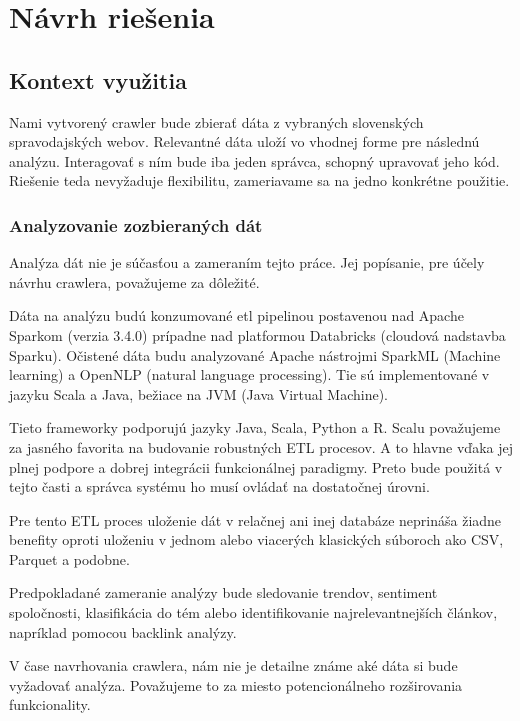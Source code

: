 
\chapter{Návrh riešenia}
\label{methodology}

\section{Kontext využitia}

Nami vytvorený crawler bude zbierať dáta z vybraných slovenských spravodajských webov. Relevantné dáta uloží vo vhodnej forme pre následnú analýzu. Interagovať s ním bude iba jeden správca, schopný upravovať jeho kód. Riešenie teda nevyžaduje flexibilitu, zameriavame sa na jedno konkrétne použitie. 

\subsection{Analyzovanie zozbieraných dát}
Analýza dát nie je súčasťou a zameraním tejto práce. Jej popísanie, pre účely návrhu crawlera, považujeme za dôležité.

Dáta na analýzu budú konzumované \acrshort{etl} pipelinou postavenou nad Apache Sparkom (verzia 3.4.0) prípadne nad platformou Databricks (cloudová nadstavba Sparku). Očistené dáta budu analyzované Apache nástrojmi SparkML (Machine learning) a OpenNLP (natural language processing). Tie sú implementované v jazyku Scala a Java, bežiace na JVM (Java Virtual Machine).


Tieto frameworky podporujú jazyky Java, Scala, Python a R. Scalu považujeme za jasného favorita na budovanie robustných ETL procesov. A to hlavne vďaka jej plnej podpore a dobrej integrácii funkcionálnej paradigmy. Preto bude použitá v tejto časti a správca systému ho musí ovládať na dostatočnej úrovni.

Pre tento ETL proces uloženie dát v relačnej ani inej databáze neprináša žiadne benefity oproti uloženiu v jednom alebo viacerých klasických súboroch ako CSV, Parquet a podobne. 

Predpokladané zameranie analýzy bude sledovanie trendov, sentiment spoločnosti, klasifikácia do tém alebo identifikovanie najrelevantnejších článkov, napríklad pomocou backlink analýzy. 

V čase navrhovania crawlera, nám nie je detailne známe aké dáta si bude vyžadovať analýza. Považujeme to za miesto potencionálneho rozširovania funkcionality. 

